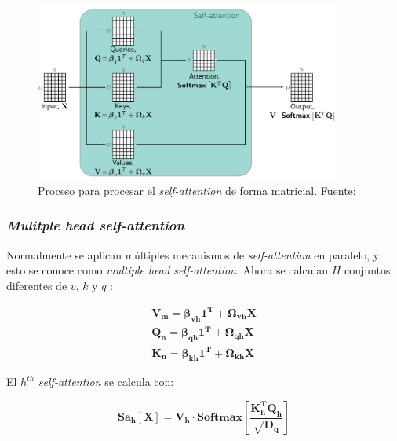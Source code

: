 \begin{figure}
	\centering
	\includegraphics[width=0.9\textwidth]{../img/theory/attention_weights_matrix.png}
	\caption{Proceso para procesar el \textit{self-attention} de forma matricial. Fuente: \cite{prince2023understanding}}
	\label{fig:self-attention}
\end{figure}



\subsubsection{\textit{Mulitple head self-attention}}

Normalmente se aplican múltiples mecanismos de \textit{self-attention} en paralelo, y esto se conoce como \textit{multiple head self-attention}. Ahora se calculan $H$ conjuntos diferentes de $v$, $k$ y $q$ \citep{prince2023understanding}:

\begin{equation}\label{eq:mha}
	\begin{gathered}
		\mathbf{ V_m = \beta_{vh}1^T + \Omega_{vh}X }\\
		\mathbf{Q_n = \beta_{qh}1^T + \Omega_{qh}X }\\
		\mathbf{K_n = \beta_{kh}1^T + \Omega_{kh}X }	
	\end{gathered}
\end{equation}

El $h^{th}$ \textit{self-attention} se calcula con:

\begin{equation}\label{eq:mha2}	
\mathbf{Sa_h[X] = V_h \cdot \mbox{Softmax}\left[ \frac{K_h^T Q_h}{ \sqrt{D_q} }  \right]}	
\end{equation}

